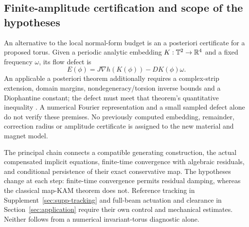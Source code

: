 \subsection{Finite-amplitude certification and scope of the hypotheses}
\label{ss:certificate-scope}

An alternative to the local normal-form budget is an a posteriori certificate for a proposed torus. Given a periodic analytic embedding $K:\mathbb T^2\to\mathbb R^4$ and a fixed frequency $\omega$, its flow defect is
\[
 E(\phi)=J\nabla h(K(\phi))-D K(\phi)\omega.
\]
An applicable a posteriori theorem additionally requires a complex-strip extension, domain margins, nondegeneracy/torsion inverse bounds and a Diophantine constant; the defect must meet that theorem's quantitative inequality \citep{haro2019aposteriori}. A numerical Fourier representation and a small sampled defect alone do not verify these premises. No previously computed embedding, remainder, correction radius or amplitude certificate is assigned to the new material and magnet model.

The principal chain connects a compatible generating construction, the actual compensated implicit equations, finite-time convergence with algebraic residuals, and conditional persistence of their exact conservative map. The hypotheses change at each step: finite-time convergence permits residual damping, whereas the classical map-KAM theorem does not. Reference tracking in Supplement~\ref{sec:supp-tracking} and full-beam actuation and clearance in Section~\ref{sec:application} require their own control and mechanical estimates. Neither follows from a numerical invariant-torus diagnostic alone.
